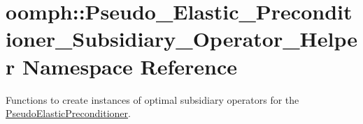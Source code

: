 \hypertarget{namespaceoomph_1_1Pseudo__Elastic__Preconditioner__Subsidiary__Operator__Helper}{}\section{oomph\+:\+:Pseudo\+\_\+\+Elastic\+\_\+\+Preconditioner\+\_\+\+Subsidiary\+\_\+\+Operator\+\_\+\+Helper Namespace Reference}
\label{namespaceoomph_1_1Pseudo__Elastic__Preconditioner__Subsidiary__Operator__Helper}


Functions to create instances of optimal subsidiary operators for the \hyperlink{classoomph_1_1PseudoElasticPreconditioner}{Pseudo\+Elastic\+Preconditioner}.  


